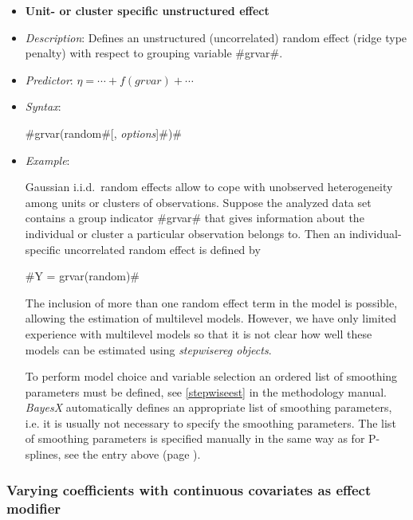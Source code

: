 \begin{itemize}
\item[]{\bf\sffamily Unit- or cluster specific unstructured
effect}

\item[] {\em Description}: Defines an unstructured (uncorrelated) random effect (ridge type penalty) with respect to
    grouping variable #grvar#.
\item[] {\em Predictor}: $\eta = \cdots + f(grvar) + \cdots$ \item[] {\em
Syntax}:

#grvar(random#[, {\em options}]#)#
\item[] {\em Example}:

Gaussian i.i.d.~random effects allow to cope with unobserved
heterogeneity among units or clusters of observations. Suppose the
analyzed data set contains a group indicator #grvar# that gives
information about the individual or cluster a particular
observation belongs to. Then an individual-specific uncorrelated
random effect is defined by

#Y = grvar(random)#

The inclusion of more than one random effect term in the model is
possible, allowing the estimation of multilevel models. However,
we have only limited experience with multilevel models so that it
is not clear how well these models can be estimated using {\em
stepwisereg objects}.


To perform model choice and variable selection an ordered list of smoothing parameters must be defined, see
\autoref{stepwiseest} in the methodology manual. {\em BayesX} automatically defines an appropriate list of smoothing
parameters, i.e. it is usually not necessary to  specify the smoothing parameters. The list of smoothing parameters is
specified manually in the same way as for P-splines, see the entry above (page \pageref{psplines_stepwise}).
\end{itemize}

\subsubsection*{Varying coefficients with continuous covariates as
effect modifier}

